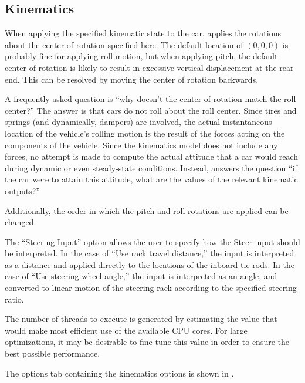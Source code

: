 \subsection{Kinematics} \label{ssec:optionsKinematics}

When applying the specified kinematic state to the car, \vvase{} applies the rotations about the center of rotation specified here.  The default location of $\left(0, 0, 0\right)$ is probably fine for applying roll motion, but when applying pitch, the default center of rotation is likely to result in excessive vertical displacement at the rear end.  This can be resolved by moving the center of rotation backwards.

A frequently asked question is ``why doesn't the center of rotation match the roll center?''  The answer is that cars do not roll about the roll center.  Since tires and springs (and dynamically, dampers) are involved, the actual instantaneous location of the vehicle's rolling motion is the result of the forces acting on the components of the vehicle.  Since the kinematics model does not include any forces, no attempt is made to compute the actual attitude that a car would reach during dynamic or even steady-state conditions.  Instead, \vvase{} answers the question ``if the car were to attain this attitude, what are the values of the relevant kinematic outputs?''

Additionally, the order in which the pitch and roll rotations are applied can be changed.

The ``Steering Input'' option allows the user to specify how the Steer input should be interpreted.  In the case of ``Use rack travel distance,'' the input is interpreted as a distance and applied directly to the locations of the inboard tie rods.  In the case of ``Use steering wheel angle,'' the input is interpreted as an angle, and converted to linear motion of the steering rack according to the specified steering ratio.

The number of threads to execute is generated by estimating the value that would make most efficient use of the available CPU cores.  For large optimizations, it may be desirable to fine-tune this value in order to ensure the best possible performance.

The options tab containing the kinematics options is shown in .


